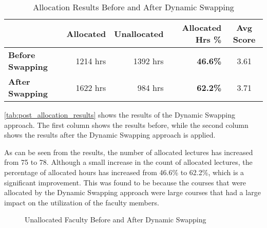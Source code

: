 \begin{table}[H]
  \centering
  \begin{tabular}{|l|r|r|r|c|}
    \hline
    \textbf{}                & \textbf{Allocated} & \textbf{Unallocated} & \textbf{Allocated Hrs \%} & \textbf{Avg Score} \\ \hline
    \textbf{Before Swapping} & 1214 hrs           & 1392 hrs             & \textbf{46.6\%}           & 3.61               \\
    \textbf{After Swapping}  & 1622 hrs           & 984 hrs              & \textbf{62.2\%}           & 3.71               \\
    \hline
  \end{tabular}
  \caption{Allocation Results Before and After Dynamic Swapping}
  \label{tab:post_allocation_results}
\end{table}

\autoref{tab:post_allocation_results} shows the results of the Dynamic Swapping approach. The first column shows the results before, while the second column shows the results after the Dynamic Swapping approach is applied.

As can be seen from the results, the number of allocated lectures has increased from 75 to 78. Although a small increase in the count of allocated lectures, the percentage of allocated hours has increased from 46.6\% to 62.2\%, which is a significant improvement. This was found to be because the courses that were allocated by the Dynamic Swapping approach were large courses that had a large impact on the utilization of the faculty members.

\begin{figure}[H]
  \centering
  \caption{Unallocated Faculty Before and After Dynamic Swapping}
  \label{fig:faculty_utilization_dynamic_swapping}
\end{figure}


